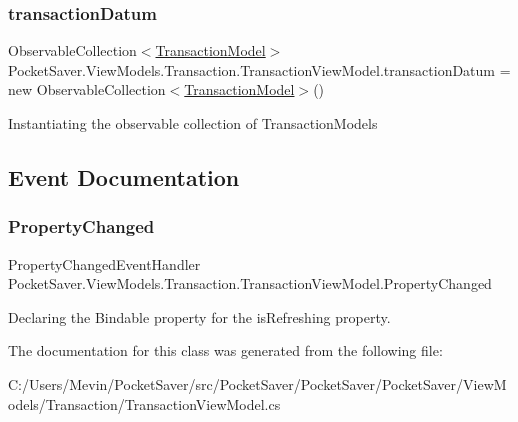 \subsubsection{\texorpdfstring{transaction\+Datum}{transactionDatum}}
{\footnotesize\ttfamily Observable\+Collection$<$\hyperlink{class_pocket_saver_1_1_models_1_1_transaction_model}{Transaction\+Model}$>$ Pocket\+Saver.\+View\+Models.\+Transaction.\+Transaction\+View\+Model.\+transaction\+Datum = new Observable\+Collection$<$\hyperlink{class_pocket_saver_1_1_models_1_1_transaction_model}{Transaction\+Model}$>$()\hspace{0.3cm}{\ttfamily [static]}}



Instantiating the observable collection of Transaction\+Models 



\subsection{Event Documentation}
\mbox{\label{class_pocket_saver_1_1_view_models_1_1_transaction_1_1_transaction_view_model_a258c2b7249a3e23d71d6669ef91d46bd}} 
\subsubsection{\texorpdfstring{Property\+Changed}{PropertyChanged}}
{\footnotesize\ttfamily Property\+Changed\+Event\+Handler Pocket\+Saver.\+View\+Models.\+Transaction.\+Transaction\+View\+Model.\+Property\+Changed}



Declaring the Bindable property for the is\+Refreshing property. 



The documentation for this class was generated from the following file\+:\begin{DoxyCompactItemize}
\item 
C\+:/\+Users/\+Mevin/\+Pocket\+Saver/src/\+Pocket\+Saver/\+Pocket\+Saver/\+Pocket\+Saver/\+View\+Models/\+Transaction/Transaction\+View\+Model.\+cs\end{DoxyCompactItemize}
